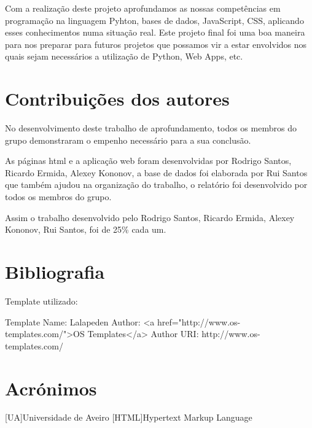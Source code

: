 \documentclass[a4paper]{report}
\begin{document}
Com a realização deste projeto aprofundamos as nossas competências em programação na linguagem Pyhton, bases de dados, JavaScript, CSS, aplicando esses conhecimentos numa situação real. Este projeto final foi uma boa maneira para nos preparar para futuros projetos que possamos vir a estar envolvidos nos quais sejam necessários a utilização de Python, Web Apps, etc.

\chapter*{Contribuições dos autores}

No desenvolvimento deste trabalho de aprofundamento, todos os membros do grupo demonstraram o empenho necessário para a sua conclusão.

As páginas html e a aplicação web foram desenvolvidas por Rodrigo Santos, Ricardo Ermida, Alexey Kononov, a base de dados foi elaborada por Rui Santos que também ajudou na organização do trabalho, o relatório foi desenvolvido por todos os membros do grupo.

Assim o trabalho desenvolvido pelo Rodrigo Santos, Ricardo Ermida, Alexey Kononov, Rui Santos, foi de 25\% cada um.

\chapter*{Bibliografia}

Template utilizado: 

Template Name: Lalapeden
Author: <a href="http://www.os-templates.com/">OS Templates</a>
Author URI: http://www.os-templates.com/



\chapter*{Acrónimos}
\begin{acronym}
[UA]{Universidade de Aveiro}
[HTML]{Hypertext Markup Language}
\end{acronym}

\end{document}
